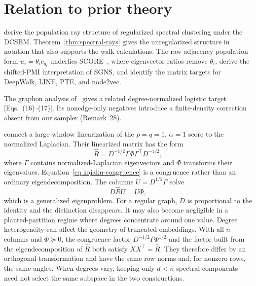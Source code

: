 \documentclass[aps,pre,reprint,superscriptaddress,longbibliography]{revtex4-2}
\begin{document}
\section{Relation to prior theory}
\label{sec:prior-theory}

\citet{qin2013regularized} derive the population ray structure of regularized spectral clustering under the DCSBM\@.
Theorem~\ref{thm:spectral-rays} gives the unregularized structure in notation that also supports the walk calculations.
The raw-adjacency population form \(u_i=\theta_i c_{g_i}\) underlies SCORE~\citep[Lemma~2.1]{jin2015fast}, where eigenvector ratios remove \(\theta_i\).
\citet{levy2014neural} derive the shifted-PMI interpretation of SGNS, and \citet{qiu2018network} identify the matrix targets for DeepWalk, LINE, PTE, and node2vec.

The graphon analysis of~\citet{davison2023asymptotics} gives a related degree-normalized logistic target [Eqs.~(16)--(17)].
Its nonedge-only negatives introduce a finite-density correction absent from our sampler (Remark~28).

\citet{kojaku2024network} connect a large-window linearization of the \(p=q=1\), \(\alpha=1\) score to the normalized Laplacian.
Their linearized matrix has the form
\begin{equation}
    \widehat{R}
    =
    D^{-1/2}\Gamma\Phi\Gamma^\top D^{-1/2},
    \label{eq:kojaku-congruence}
\end{equation}
where \(\Gamma\) contains normalized-Laplacian eigenvectors and \(\Phi\) transforms their eigenvalues.
Equation~\eqref{eq:kojaku-congruence} is a congruence rather than an ordinary eigendecomposition.
The columns \(U=D^{1/2}\Gamma\) solve
\begin{equation}
    D\widehat{R}U=U\Phi,
    \label{eq:kojaku-generalized}
\end{equation}
which is a generalized eigenproblem.
For a regular graph, \(D\) is proportional to the identity and the distinction disappears.
It may also become negligible in a planted-partition regime where degrees concentrate around one value.
Degree heterogeneity can affect the geometry of truncated embeddings.
With all \(n\) columns and \(\Phi\succeq 0\), the congruence factor \(D^{-1/2}\Gamma\Phi^{1/2}\) and the factor built from the eigendecomposition of \(\widehat{R}\) both satisfy \(XX^\top=\widehat{R}\).
They therefore differ by an orthogonal transformation and have the same row norms and, for nonzero rows, the same angles.
When degrees vary, keeping only \(d<n\) spectral components need not select the same subspace in the two constructions.
\end{document}
